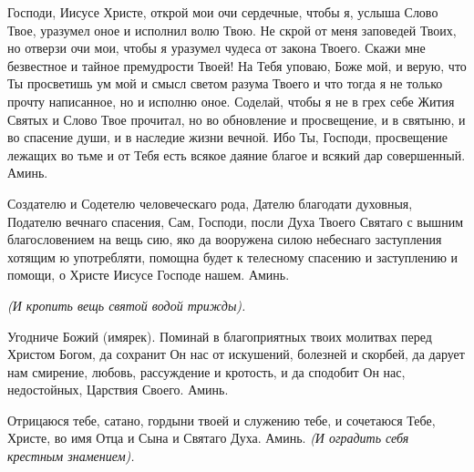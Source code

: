  



Господи, Иисусе Христе, открой мои очи сердечные, чтобы я, услыша Слово Твое, уразумел оное и исполнил волю Твою. Не скрой от меня заповедей Твоих, но отверзи очи мои, чтобы я уразумел чудеса от закона Твоего. Скажи мне безвестное и тайное премудрости Твоей! На Тебя уповаю, Боже мой, и верую, что Ты просветишь ум мой и смысл светом разума Твоего и что тогда я не только прочту написанное, но и исполню оное. Соделай, чтобы я не в грех себе Жития Святых и Слово Твое прочитал, но во обновление и просвещение, и в святыню, и во спасение души, и в наследие жизни вечной. Ибо Ты, Господи, просвещение лежащих во тьме и от Тебя есть всякое даяние благое и всякий дар совершенный. Аминь.
\mychapterending

 



Создателю и Содетелю человеческаго рода, Дателю благодати духовныя, Подателю вечнаго спасения, Сам, Господи, посли Духа Твоего Святаго с вышним благословением на вещь сию, яко да вооружена силою небеснаго заступления хотящим ю употребляти, помощна будет к телесному спасению и заступлению и помощи, о Христе Иисусе Господе нашем. Аминь. 


\itshape (И кропить вещь святой водой трижды).\normalfont{}


 
\mychapterending

 


Угодниче Божий (имярек). Поминай в благоприятных твоих молитвах перед Христом Богом, да сохранит Он нас от искушений, болезней и скорбей, да дарует нам смирение, любовь, рассуждение и кротость, и да сподобит Он нас, недостойных, Царствия Своего. Аминь.



\mychapterending

 




Отрицаюся тебе, сатано, гордыни твоей и служению тебе, и сочетаюся Тебе, Христе, во имя Отца и Сына и Святаго Духа. Аминь. \itshape (И оградить себя крестным знамением).\normalfont{}



